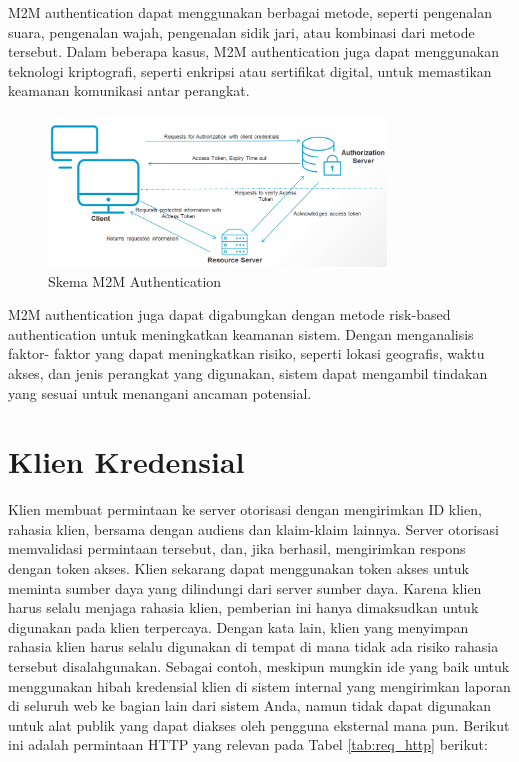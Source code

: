 M2M authentication dapat menggunakan berbagai metode, seperti pengenalan suara, pengenalan wajah, pengenalan sidik jari, atau kombinasi dari metode tersebut. Dalam beberapa kasus, M2M authentication juga dapat menggunakan teknologi kriptografi, seperti enkripsi atau sertifikat digital, untuk memastikan keamanan komunikasi antar perangkat.
\begin{figure}
    \centering
    \includegraphics[width=0.8\textwidth]{contents/chapter-3/m2m_auth.png}
    \caption{Skema M2M Authentication}
    \label{fig:m2m}
\end{figure}

M2M authentication juga dapat digabungkan dengan metode risk-based authentication untuk meningkatkan keamanan sistem. Dengan menganalisis faktor- faktor yang dapat meningkatkan risiko, seperti lokasi geografis, waktu akses, dan jenis perangkat yang digunakan, sistem dapat mengambil tindakan yang sesuai untuk menangani ancaman potensial.

\section{Klien Kredensial}
Klien membuat permintaan ke server otorisasi dengan mengirimkan ID klien, rahasia klien, bersama dengan audiens dan klaim-klaim lainnya. Server otorisasi memvalidasi permintaan tersebut, dan, jika berhasil, mengirimkan respons dengan token akses. Klien sekarang dapat menggunakan token akses untuk meminta sumber daya yang dilindungi dari server sumber daya.
Karena klien harus selalu menjaga rahasia klien, pemberian ini hanya dimaksudkan untuk digunakan pada klien terpercaya. Dengan kata lain, klien yang menyimpan rahasia klien harus selalu digunakan di tempat di mana tidak ada risiko rahasia tersebut disalahgunakan. Sebagai contoh, meskipun mungkin ide yang baik untuk menggunakan hibah kredensial klien di sistem internal yang mengirimkan laporan di seluruh web ke bagian lain dari sistem Anda, namun tidak dapat digunakan untuk alat publik yang dapat diakses oleh pengguna eksternal mana pun.
Berikut ini adalah permintaan HTTP yang relevan pada Tabel \ref{tab:req_http} berikut:

